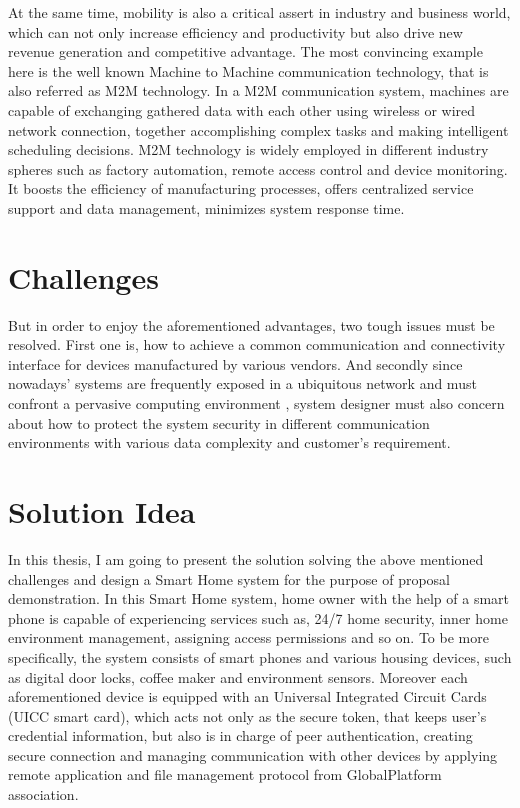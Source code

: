 At the same time, mobility is also a critical assert in industry and business world, which can not only increase efficiency and productivity but also drive new revenue generation and competitive advantage. The most convincing example here is the well known Machine to Machine communication technology, that is also referred as M2M technology. In a M2M communication system, machines are capable of  exchanging gathered data with each other using wireless or wired network connection, together accomplishing complex tasks and making intelligent scheduling decisions. M2M technology is widely employed in different industry spheres such as factory automation, remote access control and device monitoring. It boosts the efficiency of manufacturing processes, offers centralized service support and data management, minimizes system response time.

\section{Challenges}
But in order to enjoy the aforementioned advantages, two tough issues must be resolved. First one is, how to achieve a common communication and connectivity interface for devices manufactured by various vendors. And secondly since nowadays' systems are frequently exposed in a ubiquitous network and must confront a pervasive computing environment \cite{embedded_secure}, system designer must also concern about how to protect the system security in different communication environments with various data complexity and customer's requirement.

\section{Solution Idea}\label{secSolutionIdea}
In this thesis, I am going to present the solution solving the above mentioned challenges and design a Smart Home system for the purpose of proposal demonstration. In this Smart Home system, home owner with the help of a smart phone is capable of experiencing services such as, 24/7 home security, inner home environment management, assigning access permissions and so on. To be more specifically, the system consists of smart phones and various housing devices, such as digital door locks, coffee maker and environment sensors. Moreover each aforementioned device is equipped with an Universal Integrated Circuit Cards (UICC smart card), which acts not only as the secure token, that keeps user's credential information, but also is in charge of peer authentication, creating secure connection and managing communication with other devices by applying remote application and file management protocol from GlobalPlatform association.

